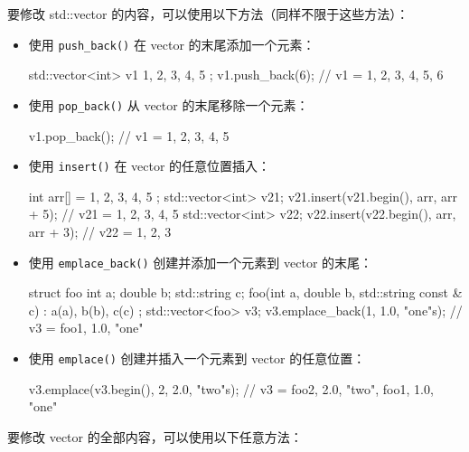 要修改 std::vector 的内容，可以使用以下方法（同样不限于这些方法）：

\begin{itemize}
\item
使用 \verb|push_back()| 在 vector 的末尾添加一个元素：

\begin{cpp}
std::vector<int> v1{ 1, 2, 3, 4, 5 };
v1.push_back(6); // v1 = { 1, 2, 3, 4, 5, 6 }
\end{cpp}

\item
使用 \verb|pop_back()| 从 vector 的末尾移除一个元素：

\begin{cpp}
v1.pop_back();   // v1 = { 1, 2, 3, 4, 5 }
\end{cpp}

\item
使用 \verb|insert()| 在 vector 的任意位置插入：

\begin{cpp}
int arr[] = { 1, 2, 3, 4, 5 };
std::vector<int> v21;
v21.insert(v21.begin(), arr, arr + 5); // v21 = { 1, 2, 3, 4, 5 }
std::vector<int> v22;
v22.insert(v22.begin(), arr, arr + 3); // v22 = { 1, 2, 3 }
\end{cpp}

\item
使用 \verb|emplace_back()| 创建并添加一个元素到 vector 的末尾：

\begin{cpp}
struct foo
{
    int a;
    double b;
    std::string c;
    foo(int a, double b, std::string const & c) :
    a(a), b(b), c(c) {}
};
std::vector<foo> v3;
v3.emplace_back(1, 1.0, "one"s);
// v3 = { foo{1, 1.0, "one"} }
\end{cpp}

\item
使用 \verb|emplace()| 创建并插入一个元素到 vector 的任意位置：

\begin{cpp}
v3.emplace(v3.begin(), 2, 2.0, "two"s);
// v3 = { foo{2, 2.0, "two"}, foo{1, 1.0, "one"} }
\end{cpp}
\end{itemize}

要修改 vector 的全部内容，可以使用以下任意方法：

